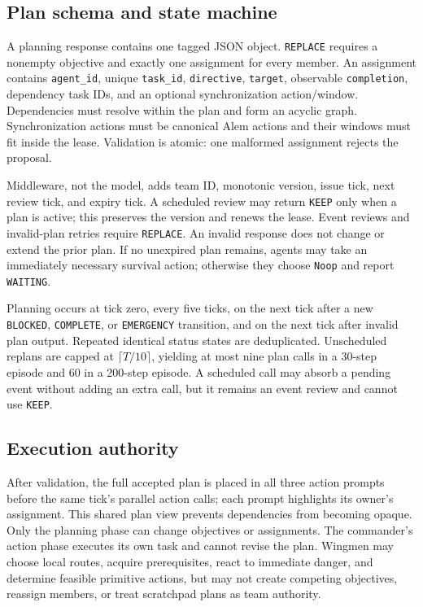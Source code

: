 \documentclass[11pt]{article}
\newcommand{\code}[1]{\texttt{#1}}
\begin{document}
\subsection{Plan schema and state machine}

A planning response contains one tagged JSON object.  \code{REPLACE} requires a
nonempty objective and exactly one assignment for every member.  An assignment
contains \code{agent\_id}, unique \code{task\_id}, \code{directive},
\code{target}, observable \code{completion}, dependency task IDs, and an optional
synchronization action/window.  Dependencies must resolve within the plan and
form an acyclic graph.  Synchronization actions must be canonical Alem actions
and their windows must fit inside the lease.  Validation is atomic: one malformed
assignment rejects the proposal.

Middleware, not the model, adds team ID, monotonic version, issue tick, next
review tick, and expiry tick.  A scheduled review may return \code{KEEP} only
when a plan is active; this preserves the version and renews the lease.  Event
reviews and invalid-plan retries require \code{REPLACE}.  An invalid response
does not change or extend the prior plan.  If no unexpired plan remains, agents
may take an immediately necessary survival action; otherwise they choose
\code{Noop} and report \code{WAITING}.

Planning occurs at tick zero, every five ticks, on the next tick after a new
\code{BLOCKED}, \code{COMPLETE}, or \code{EMERGENCY} transition, and on the next
tick after invalid plan output.  Repeated identical status states are deduplicated.
Unscheduled replans are capped at $\lceil T/10\rceil$, yielding at most nine plan
calls in a 30-step episode and 60 in a 200-step episode.  A scheduled call may
absorb a pending event without adding an extra call, but it remains an event
review and cannot use \code{KEEP}.

\subsection{Execution authority}

After validation, the full accepted plan is placed in all three action prompts
before the same tick's parallel action calls; each prompt highlights its owner's
assignment.  This shared plan view prevents dependencies from becoming opaque.
Only the planning phase can change objectives or assignments.  The commander's
action phase executes its own task and cannot revise the plan.  Wingmen may choose
local routes, acquire prerequisites, react to immediate danger, and determine
feasible primitive actions, but may not create competing objectives, reassign
members, or treat scratchpad plans as team authority.
\end{document}
